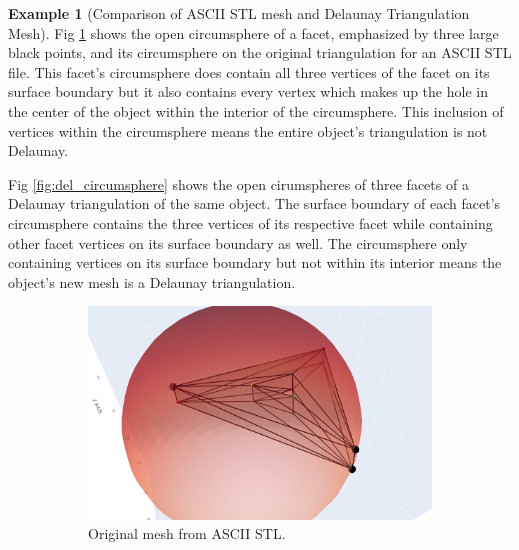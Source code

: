 \documentclass[ma]{uncgdissertationexp}
\theoremstyle{plain}
\theoremstyle{definition}
\newtheorem{example}[theorem]{Example}
\theoremstyle{remark}
\begin{document}
\begin{example}[Comparison of ASCII STL mesh and Delaunay Triangulation Mesh] Fig \ref{fig:ast_circumsphere} shows the open circumsphere of a facet, emphasized by three large black points, and its circumsphere on the original triangulation for an ASCII STL file. This facet's circumsphere does contain all three vertices of the facet on its surface boundary but it also contains every vertex which makes up the hole in the center of the object within the interior of the circumsphere. This inclusion of vertices within the circumsphere means the entire object's triangulation is not Delaunay.
\par Fig \ref{fig:del_circumsphere} shows the open cirumspheres of three facets of a Delaunay triangulation of the same object. The surface boundary of each facet's circumsphere contains the three vertices of its respective facet while containing other facet vertices on its surface boundary as well. The circumsphere only containing vertices on its surface boundary but not within its interior means the object's new mesh is a Delaunay triangulation.
\begin{figure}[H]
    \centering
    \begin{subfigure}[b]{0.49\textwidth}
        \centering
        \includegraphics[width=\textwidth]{Final Run, (triangular prism - triangle hole) ast plotly screenshot circumsphere.png}
        \caption{Original mesh from ASCII STL.}
        \label{fig:ast_circumsphere}
    \end{subfigure}
    \begin{subfigure}[b]{0.49\textwidth}
        \centering

\end{subfigure}
\end{figure}
\end{example}
\end{document}
